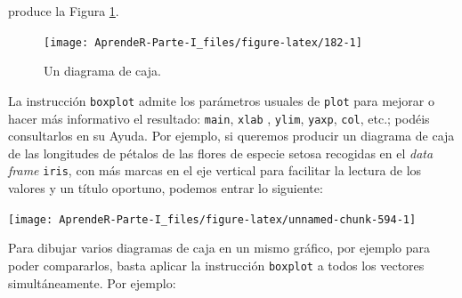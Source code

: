 \documentclass[]{book}
\newenvironment{Shaded}{\begin{snugshade}}{\end{snugshade}}
\newcommand{\DataTypeTok}[1]{\textcolor[rgb]{0.13,0.29,0.53}{#1}}
\newcommand{\DecValTok}[1]{\textcolor[rgb]{0.00,0.00,0.81}{#1}}
\newcommand{\FloatTok}[1]{\textcolor[rgb]{0.00,0.00,0.81}{#1}}
\newcommand{\KeywordTok}[1]{\textcolor[rgb]{0.13,0.29,0.53}{\textbf{#1}}}
\newcommand{\NormalTok}[1]{#1}
\newcommand{\OperatorTok}[1]{\textcolor[rgb]{0.81,0.36,0.00}{\textbf{#1}}}
\newcommand{\StringTok}[1]{\textcolor[rgb]{0.31,0.60,0.02}{#1}}
\theoremstyle{definition}
\theoremstyle{definition}
\theoremstyle{definition}
\theoremstyle{remark}
\begin{document}
produce la Figura \ref{fig:182}.

\begin{figure}

{\centering \texttt{[image: AprendeR-Parte-I\_files/figure-latex/182-1]} 

}

\caption{Un diagrama de caja.}\label{fig:182}
\end{figure}

La instrucción \texttt{boxplot} admite los parámetros usuales de \texttt{plot} para mejorar o hacer más informativo el resultado: \texttt{main}, \texttt{xlab} , \texttt{ylim}, \texttt{yaxp}, \texttt{col}, etc.; podéis consultarlos en su Ayuda. Por ejemplo, si queremos producir un diagrama de caja de las longitudes de pétalos de las flores de especie setosa recogidas en el \emph{data frame} \texttt{iris}, con más marcas en el eje vertical para facilitar la lectura de los valores y un título oportuno, podemos entrar lo siguiente:

\begin{Shaded}
\end{Shaded}

\begin{center}\texttt{[image: AprendeR-Parte-I\_files/figure-latex/unnamed-chunk-594-1]} \end{center}

Para dibujar varios diagramas de caja en un mismo gráfico, por ejemplo para poder compararlos, basta aplicar la instrucción \texttt{boxplot} a todos los vectores simultáneamente. Por ejemplo:
\end{document}
